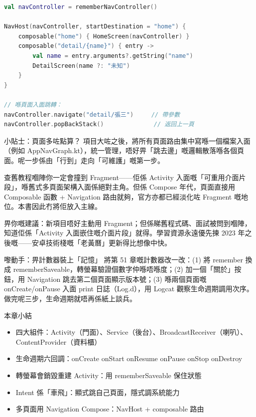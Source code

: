 \begin{lstlisting}[language=Kotlin]
val navController = rememberNavController()

NavHost(navController, startDestination = "home") {
    composable("home") { HomeScreen(navController) }
    composable("detail/{name}") { entry ->
        val name = entry.arguments?.getString("name")
        DetailScreen(name ?: "未知")
    }
}

// 喺頁面入面跳轉：
navController.navigate("detail/張三")     // 帶參數
navController.popBackStack()              // 返回上一頁
\end{lstlisting}

\begin{tcbinfo}{小貼士：頁面多咗點算？}
項目大咗之後，將所有頁面路由集中寫喺一個檔案入面（例如 AppNavGraph.kt），統一管理，唔好畀「跳去邊」嘅邏輯散落喺各個頁面。呢一步係由「行到」走向「可維護」嘅第一步。

\end{tcbinfo}


查舊教程嗰陣你一定會撞到 Fragment——佢係 Activity 入面嘅「可重用介面片段」，喺舊式多頁面架構入面係絕對主角。但係 Compose 年代，頁面直接用 Composable 函數 + Navigation 路由就夠，官方亦都已經淡化咗 Fragment 嘅地位。本書因此冇將佢放入主線。

畀你嘅建議：新項目唔好主動用 Fragment；但係睇舊程式碼、面試被問到嗰陣，知道佢係「Activity 入面嵌住嘅介面片段」就得。學習資源永遠優先揀 2023 年之後嘅——安卓技術棧嘅「老黃曆」更新得比想像中快。

\begin{tcbpractice}{嚟動手：畀計數器裝上「記憶」}
將第 51 章嘅計數器改一改：(1) 將 remember 換成 rememberSaveable，轉螢幕驗證個數字仲喺唔喺度；(2) 加一個「關於」按鈕，用 Navigation 跳去第二個頁面顯示版本號；(3) 喺兩個頁面嘅 onCreate/onPause 入面 print 日誌（Log.d），用 Logcat 觀察生命週期調用次序。做完呢三步，生命週期就唔再係紙上談兵。

\end{tcbpractice}

\begin{tcbsummary}{本章小結}
\begin{itemize}
  \item 四大組件：Activity（門面）、Service（後台）、BroadcastReceiver（喇叭）、ContentProvider（資料櫃）
  \item 生命週期六回調：onCreate onStart onResume onPause onStop onDestroy
  \item 轉螢幕會銷毀重建 Activity：用 rememberSaveable 保住狀態
  \item Intent 係「車飛」：顯式跳自己頁面，隱式調系統能力
  \item 多頁面用 Navigation Compose：NavHost + composable 路由
\end{itemize}

\end{tcbsummary}
